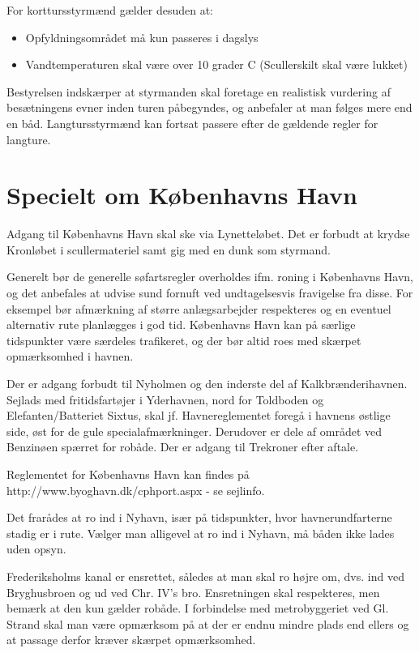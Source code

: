 \documentclass{article}
\begin{document}
For korttursstyrmænd gælder desuden at: \begin{itemize} \item
Opfyldningsområdet må kun passeres i dagslys \item Vandtemperaturen skal
være over 10 grader C (Scullerskilt skal være lukket) \end{itemize}

Bestyrelsen indskærper at styrmanden skal foretage en realistisk
vurdering af besætningens evner inden turen påbegyndes, og anbefaler at
man følges mere end en båd. Langtursstyrmænd kan fortsat passere efter de
gældende regler for langture.

\section{Specielt om Københavns Havn}

Adgang til Københavns Havn skal ske via Lynetteløbet.  Det er forbudt at
krydse Kronløbet i scullermateriel samt gig med en dunk som styrmand.

Generelt bør de generelle søfartsregler overholdes ifm. roning i
Københavns Havn, og det anbefales at udvise sund fornuft ved
undtagelsesvis fravigelse fra disse. For eksempel bør afmærkning af
større anlægsarbejder respekteres og en eventuel alternativ rute
planlægges i god tid. Københavns Havn kan på særlige tidspunkter være
særdeles trafikeret, og der bør altid roes med skærpet opmærksomhed i
havnen.

Der er adgang forbudt til Nyholmen og den inderste del af
Kalkbrænderihavnen. Sejlads med fritidsfartøjer i Yderhavnen, nord for
Toldboden og Elefanten/Batteriet Sixtus, skal jf. Havnereglementet foregå
i havnens østlige side, øst for de gule specialafmærkninger.  Derudover
er dele af området ved Benzinøen spærret for robåde. Der er adgang til
Trekroner efter aftale.

Reglementet for Københavns Havn kan findes på
http://www.byoghavn.dk/cphport.aspx - se sejlinfo.

Det frarådes at ro ind i Nyhavn, især på tidspunkter, hvor
havnerundfarterne stadig er i rute. Vælger man alligevel at ro ind i
Nyhavn, må båden ikke lades uden opsyn.

Frederiksholms kanal er ensrettet, således at man skal ro højre om, dvs.
ind ved Bryghusbroen og ud ved Chr.  IV's bro. Ensretningen skal
respekteres, men bemærk at den kun gælder robåde. I forbindelse med
metrobyggeriet ved Gl. Strand skal man være opmærksom på at der er endnu
mindre plads end ellers og at passage derfor kræver skærpet opmærksomhed.
\end{document}
